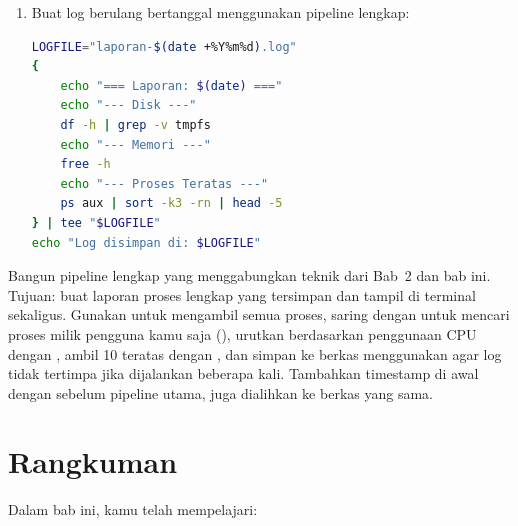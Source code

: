 \begin{enumerate}
    \item Buat log berulang bertanggal menggunakan pipeline lengkap:
\begin{lstlisting}[language=bash, caption={Log bertanggal dengan pipeline dan tee}]
LOGFILE="laporan-$(date +%Y%m%d).log"
{
    echo "=== Laporan: $(date) ==="
    echo "--- Disk ---"
    df -h | grep -v tmpfs
    echo "--- Memori ---"
    free -h
    echo "--- Proses Teratas ---"
    ps aux | sort -k3 -rn | head -5
} | tee "$LOGFILE"
echo "Log disimpan di: $LOGFILE"
\end{lstlisting}
\end{enumerate}

\begin{challengebox}
Bangun pipeline lengkap yang menggabungkan teknik dari Bab~2 dan bab ini. Tujuan: buat laporan proses lengkap yang tersimpan dan tampil di terminal sekaligus. Gunakan  untuk mengambil semua proses, saring dengan  untuk mencari proses milik pengguna kamu saja (), urutkan berdasarkan penggunaan CPU dengan , ambil 10 teratas dengan , dan simpan ke berkas  menggunakan  agar log tidak tertimpa jika dijalankan beberapa kali. Tambahkan timestamp di awal dengan  sebelum pipeline utama, juga dialihkan ke berkas yang sama.
\end{challengebox}

\section{Rangkuman}

Dalam bab ini, kamu telah mempelajari:

